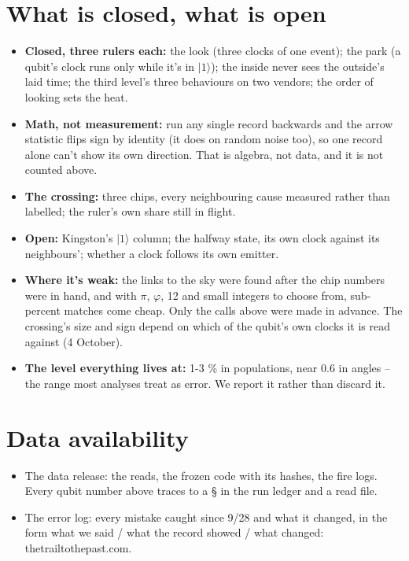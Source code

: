 \documentclass[11pt]{article}
\begin{document}
\section{What is closed, what is open}
\begin{itemize}
\item \textbf{Closed, three rulers each:} the look (three clocks of one event); the park (a qubit's clock runs only while it's in \(|1\rangle\)); the inside never sees the outside's laid time; the third level's three behaviours on two vendors; the order of looking sets the heat.
\item \textbf{Math, not measurement:} run any single record backwards and the arrow statistic flips sign by identity (it does on random noise too), so one record alone can't show its own direction. That is algebra, not data, and it is not counted above.
\item \textbf{The crossing:} three chips, every neighbouring cause measured rather than labelled; the ruler's own share still in flight.
\item \textbf{Open:} Kingston's \(|1\rangle\) column; the halfway state, its own clock against its neighbours'; whether a clock follows its own emitter.
\item \textbf{Where it's weak:} the links to the sky were found after the chip numbers were in hand, and with \(\pi\), \(\varphi\), 12 and small integers to choose from, sub-percent matches come cheap. Only the calls above were made in advance. The crossing's size and sign depend on which of the qubit's own clocks it is read against (4 October).
\item \textbf{The level everything lives at:} 1-3 \% in populations, near 0.6 in angles -- the range most analyses treat as error. We report it rather than discard it.
\end{itemize}
\section*{Data availability}
\begin{itemize}
\item The data release: the reads, the frozen code with its hashes, the fire logs. Every qubit number above traces to a \S{} in the run ledger and a read file.
\item The error log: every mistake caught since 9/28 and what it changed, in the form what we said / what the record showed / what changed: thetrailtothepast.com.
\end{itemize}
\end{document}
